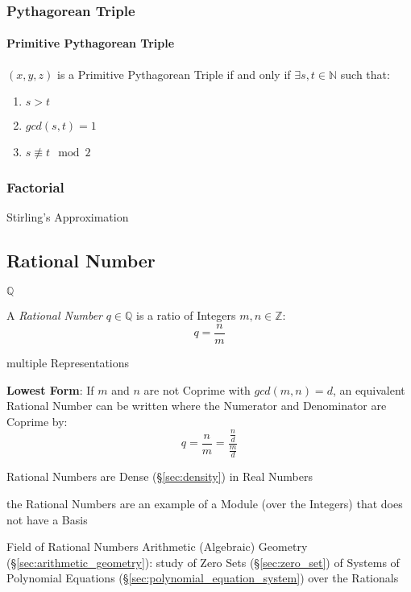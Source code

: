 \subsubsection{Pythagorean Triple}\label{sec:pythagorean_triple}

\paragraph{Primitive Pythagorean Triple}\label{sec:primitive_pythagorean}\hfill

$(x,y,z)$ is a Primitive Pythagorean Triple if and only if $\exists
s,t \in \mathbb{N}$ such that:
\begin{enumerate}
  \item $s > t$
  \item $gcd (s,t) = 1$
  \item $s \not\equiv t \mod 2$
\end{enumerate}



\subsubsection{Factorial}\label{sec:factorial}

Stirling's Approximation



\subsection{Rational Number}\label{sec:rational}

$\mathbb{Q}$

A \emph{Rational Number} $q \in \mathbb{Q}$ is a ratio of Integers
$m,n \in \mathbb{Z}$:
\[
  q = \frac{n}{m}
\]

multiple Representations

\textbf{Lowest Form}: If $m$ and $n$ are not Coprime with $gcd (m,n) =
d$, an equivalent Rational Number can be written where the Numerator
and Denominator are Coprime by:
\[
  q = \frac{n}{m} = \frac{\frac{n}{d}}{\frac{m}{d}}
\]

Rational Numbers are Dense (\S\ref{sec:density}) in Real Numbers

the Rational Numbers are an example of a Module (over the Integers) that does
not have a Basis

Field of Rational Numbers \fist Arithmetic (Algebraic) Geometry
(\S\ref{sec:arithmetic_geometry}): study of Zero Sets (\S\ref{sec:zero_set}) of
Systems of Polynomial Equations (\S\ref{sec:polynomial_equation_system}) over
the Rationals

